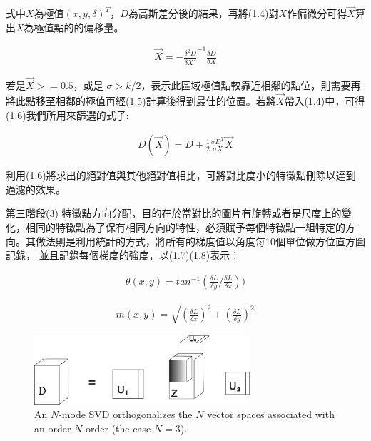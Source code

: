    式中$X$為極值$(x,y,\delta)^T$，$D$為高斯差分後的結果，再將(1.4)對$X$作偏微分可得$\vec{X}$算出$X$為極值點的的偏移量。
   
\begin{align}
  \vec{X} = -\frac{\delta^2 D}{\delta X^2}^{-1}\frac{\delta D}{\delta X}
\end{align}   
   
   
   若是$\vec{X} >= 0.5$，或是 $\sigma > k/2$，表示此區域極值點較靠近相鄰的點位，則需要再將此點移至相鄰的極值再經(1.5)計算後得到最佳的位置。若將$\vec{X}$帶入(1.4)中，可得(1.6)我們所用來篩選的式子:
   
\begin{align}
  D(\vec{X}) = D+\frac{1}{2} \frac{\sigma D^T}{\sigma X} \vec{X}
\end{align}      
   
   利用(1.6)將求出的絕對值與其他絕對值相比，可將對比度小的特徵點刪除以達到過濾的效果。
   
   第三階段(3) 特徵點方向分配，目的在於當對比的圖片有旋轉或者是尺度上的變化，相同的特徵點為了保有相同方向的特性，必須賦予每個特徵點一組特定的方向。其做法則是利用統計的方式，將所有的梯度值以角度每10個單位做方位直方圖記錄，
並且記錄每個梯度的強度，以(1.7)(1.8)表示：

\begin{align}
	\theta (x,y)= tan^{-1}(\frac{\delta L}{\delta y}/\frac{\delta L}{\delta x}))
\end{align}      
   
\begin{align}
	m(x,y) = \sqrt{(\frac{\delta L}{\delta x})^2+(\frac{\delta L}{\delta y})^2}
\end{align}



\begin{figure}[htbp] %
\centering \includegraphics[width=8cm,keepaspectratio
  ]{figures/coretensor.eps}
\caption{An $N$-mode SVD orthogonalizes the $N$ vector spaces associated with an order-$N$ order (the case $N=3$).}
\label{fig:N-mode}
\end{figure}